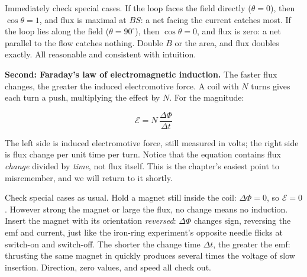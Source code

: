 Immediately check special cases. If the loop faces the field directly (\(\theta=0\)), then \(\cos\theta=1\), and flux is maximal at \(BS\): a net facing the current catches most. If the loop lies along the field (\(\theta=90^{\circ}\)), then \(\cos\theta=0\), and flux is zero: a net parallel to the flow catches nothing. Double \(B\) or the area, and flux doubles exactly. All reasonable and consistent with intuition.

\textbf{Second: Faraday's law of electromagnetic induction.} The faster flux changes, the greater the induced electromotive force. A coil with \(N\) turns gives each turn a push, multiplying the effect by \(N\). For the magnitude:

\[
\mathcal{E} = N\,\frac{\Delta\Phi}{\Delta t}
\]

The left side is induced electromotive force, still measured in volts; the right side is flux change per unit time per turn. Notice that the equation contains flux \emph{change} divided by \emph{time}, not flux itself. This is the chapter's easiest point to misremember, and we will return to it shortly.

Check special cases as usual. Hold a magnet still inside the coil: \(\Delta\Phi=0\), so \(\mathcal{E}=0\). However strong the magnet or large the flux, no change means no induction. Insert the magnet with its orientation \emph{reversed}: \(\Delta\Phi\) changes sign, reversing the emf and current, just like the iron-ring experiment's opposite needle flicks at switch-on and switch-off. The shorter the change time \(\Delta t\), the greater the emf: thrusting the same magnet in quickly produces several times the voltage of slow insertion. Direction, zero values, and speed all check out.

